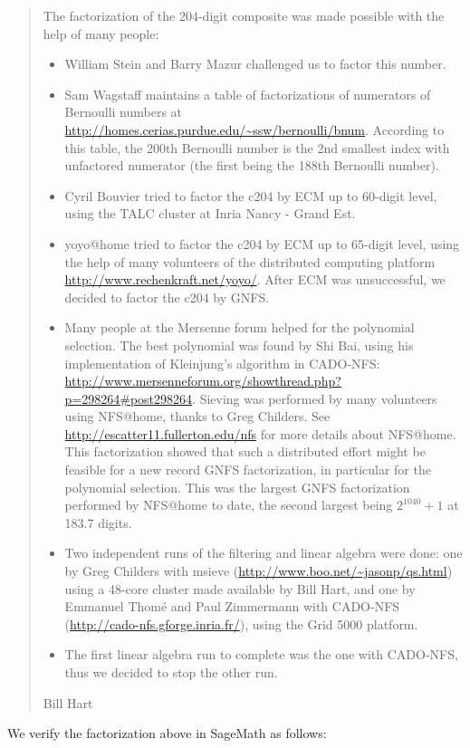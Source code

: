 \documentclass[openany]{book}
\theoremstyle{plain}
\theoremstyle{definition}
\begin{document}
{\begin{quote}
The factorization of the 204-digit composite was made possible with the help
of many people:
\begin{itemize}
\item William Stein and Barry Mazur challenged us to factor this number.
\item Sam Wagstaff maintains a table of factorizations of numerators of Bernoulli
  numbers at \url{http://homes.cerias.purdue.edu/~ssw/bernoulli/bnum}. According
  to this table, the 200th Bernoulli number is the 2nd smallest index with
  unfactored numerator (the first being the 188th Bernoulli number).
\item Cyril Bouvier tried to factor the c204 by ECM up to 60-digit level, using
  the TALC cluster at Inria Nancy - Grand Est.
\item {\sf yoyo@home} tried to factor the c204 by ECM up to 65-digit level, using the
  help of many volunteers of the distributed computing platform
  \url{http://www.rechenkraft.net/yoyo/}.
 After ECM was unsuccessful, we decided to factor the c204 by GNFS.
\item Many people at the Mersenne forum helped for the polynomial selection. The best
  polynomial was found by Shi Bai, using his implementation of Kleinjung's
  algorithm in CADO-NFS:
  \url{http://www.mersenneforum.org/showthread.php?p=298264#post298264}.
 Sieving was performed by many volunteers using {\sf NFS@home}, thanks to Greg
  Childers. See \url{http://escatter11.fullerton.edu/nfs} for more details
  about {\sf NFS@home}.
  This factorization showed that such a distributed effort might be feasible for a
  new record GNFS factorization, in particular for the polynomial selection.
  This was the largest GNFS factorization performed by {\sf NFS@home} to date,
  the second largest being $2^{1040}+1$ at 183.7 digits.
\item Two independent runs of the filtering and linear algebra were done: one by Greg
  Childers with msieve (\url{http://www.boo.net/~jasonp/qs.html}) using a 48-core
  cluster made available by Bill Hart, and one by Emmanuel Thom\'{e} and Paul
  Zimmermann with CADO-NFS (\url{http://cado-nfs.gforge.inria.fr/}), using the Grid
  5000 platform.
\item The first linear algebra run to complete was the one with CADO-NFS, thus we
  decided to stop the other run.
\end{itemize}

Bill Hart
\end{quote}

We verify the factorization above in SageMath as follows: \\

}
\end{document}
